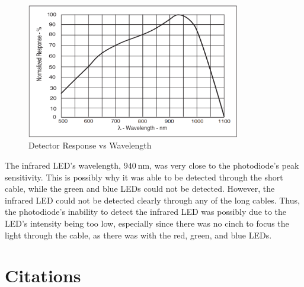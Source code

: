 \documentclass[12pt]{iopart} %
\gdef\units#1{~\mathrm{#1}}
\begin{document}
\begin{figure}[htbp]
  \begin{indented}
  \item[]\includegraphics[width=0.83\textwidth]{detector-response-vs-wavelength.png}
  \end{indented}
  \caption{\label{fig:respones_wavelength_graph}
  Detector Response vs Wavelength
  }
\end{figure}

The infrared LED's wavelength, $940 \units{nm}$, was very close to the photodiode's peak sensitivity.
This is possibly why it was able to be detected through the short cable, while the green and blue LEDs could not be detected.
However, the infrared LED could not be detected clearly through any of the long cables.
Thus, the photodiode's inability to detect the infrared LED was possibly due to the LED's intensity being too low, especially since there was no cinch to focus the light through the cable, as there was with the red, green, and blue LEDs.

\section{Citations}
\end{document}
